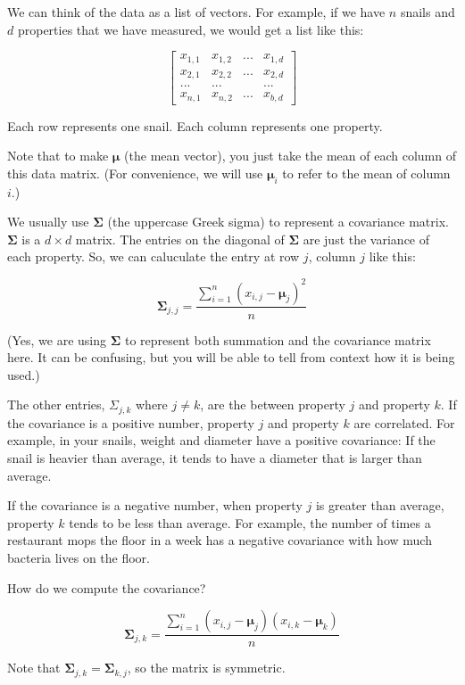 We can think of the data as a list of vectors.
For example, if we have $n$ snails and $d$ properties that we have measured, we would get a list like this:

$$\begin{bmatrix}
x_{1,1} & x_{1,2} & ... & x_{1,d} \\
x_{2,1} & x_{2,2} & ... & x_{2,d} \\
... & ... & &... \\
x_{n,1} & x_{n,2} & ... & x_{b,d}\end{bmatrix}$$

Each row represents one snail. Each column represents one property.

Note that to make $\boldsymbol\mu$ (the mean vector), you just take the mean of each column of this data matrix. (For convenience, we will use $\boldsymbol\mu_i$ to refer to the mean of column $i$.)

We usually use $\mathbf{\Sigma}$ (the uppercase Greek sigma) to represent a covariance matrix. $\mathbf{\Sigma}$ is a $d \times d$ matrix.
The entries on the diagonal of $\mathbf{\Sigma}$ are just the variance of each property.
So, we can caluculate the entry at row $j$, column $j$ like this:

$$\mathbf{\Sigma}_{j,j} = \frac{\sum_{i=1}^{n}(x_{i,j} - \boldsymbol\mu_j)^2}{n}$$

(Yes, we are using $\mathbf{\Sigma}$ to represent both summation and the covariance matrix here.
It can be confusing, but you will be able to tell from context how it is being used.)

The other entries, $\Sigma_{j,k}$ where $j \neq k$, are the  between property $j$ and property $k$.
If the covariance is a positive number, property $j$ and property $k$ are correlated. For example, in your snails, weight and diameter have a positive covariance: If the snail is heavier than average, it tends to have a diameter that is larger than average.

If the covariance is a negative number, when property $j$ is greater than average, property $k$ tends to be less than average.
For example, the number of times a restaurant mops the floor in a week has a negative covariance with how much bacteria lives on the floor.

How do we compute the covariance?

$$\mathbf{\Sigma}_{j,k} = \frac{\sum_{i=1}^{n}(x_{i,j} - \boldsymbol\mu_j)(x_{i,k} - \boldsymbol\mu_k)}{n}$$

Note that $\mathbf{\Sigma}_{j,k} = \mathbf{\Sigma}_{k,j}$, so the matrix is symmetric.

